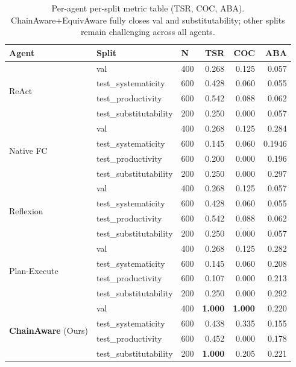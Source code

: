 ﻿\documentclass{article}
\begin{document}
\begin{table}[h]
    \centering
    \small
    \begin{tabular}{lllrrr}
        \toprule
        Agent & Split & N & TSR & COC & ABA \\
        \midrule
        \multirow{4}{*}{ReAct}
            & val                       & 400 & 0.268 & 0.125 & 0.057 \\
            & test\_systematicity       & 600 & 0.428 & 0.060 & 0.055 \\
            & test\_productivity        & 600 & 0.542 & 0.088 & 0.062 \\
            & test\_substitutability    & 200 & 0.250 & 0.000 & 0.057 \\
        \midrule
        \multirow{4}{*}{Native FC}
            & val                       & 400 & 0.268 & 0.125 & 0.284 \\
            & test\_systematicity       & 600 & 0.145 & 0.060 & 0.1946 \\
            & test\_productivity        & 600 & 0.200 & 0.000 & 0.196 \\
            & test\_substitutability    & 200 & 0.250 & 0.000 & 0.297 \\
        \midrule
        \multirow{4}{*}{Reflexion}
            & val                       & 400 & 0.268 & 0.125 & 0.057 \\
            & test\_systematicity       & 600 & 0.428 & 0.060 & 0.055 \\
            & test\_productivity        & 600 & 0.542 & 0.088 & 0.062 \\
            & test\_substitutability    & 200 & 0.250 & 0.000 & 0.057 \\
        \midrule
        \multirow{4}{*}{Plan-Execute}
            & val                       & 400 & 0.268 & 0.125 & 0.282 \\
            & test\_systematicity       & 600 & 0.145 & 0.060 & 0.208 \\
            & test\_productivity        & 600 & 0.107 & 0.000 & 0.213 \\
            & test\_substitutability    & 200 & 0.250 & 0.000 & 0.292 \\
        \midrule
        \multirow{4}{*}{\textbf{ChainAware} (Ours)}
            & val                       & 400 & \textbf{1.000} & \textbf{1.000} & 0.220 \\
            & test\_systematicity       & 600 & 0.438 & 0.335 & 0.155 \\
            & test\_productivity        & 600 & 0.452 & 0.000 & 0.178 \\
            & test\_substitutability    & 200 & \textbf{1.000} & 0.205 & 0.221 \\
        \bottomrule
    \end{tabular}
    \caption{Per-agent per-split metric table (TSR, COC, ABA). ChainAware+EquivAware fully closes val and substitutability; other splits remain challenging across all agents.}
    \label{tab:full-metrics}
\end{table}
\end{document}
